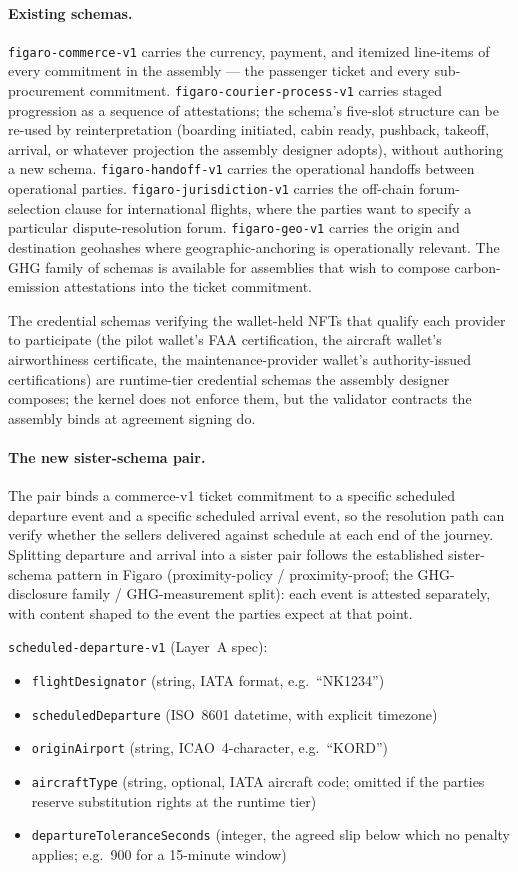 \documentclass[11pt,a4paper]{article}
\theoremstyle{definition}
\theoremstyle{remark}
\begin{document}
\paragraph{Existing schemas.}
\texttt{figaro-commerce-v1} carries the currency, payment, and
itemized line-items of every commitment in the assembly --- the
passenger ticket and every sub-procurement commitment.
\texttt{figaro-courier-process-v1} carries staged progression
as a sequence of attestations; the schema's five-slot structure
can be re-used by reinterpretation (boarding initiated, cabin
ready, pushback, takeoff, arrival, or whatever projection the
assembly designer adopts), without authoring a new schema.
\texttt{figaro-handoff-v1} carries the operational handoffs
between operational parties.
\texttt{figaro-jurisdiction-v1} carries the off-chain
forum-selection clause for international flights, where the
parties want to specify a particular dispute-resolution forum.
\texttt{figaro-geo-v1} carries the origin and destination
geohashes where geographic-anchoring is operationally relevant.
The GHG family of schemas is available for assemblies that wish
to compose carbon-emission attestations into the ticket
commitment.

The credential schemas verifying the wallet-held NFTs that
qualify each provider to participate (the pilot wallet's FAA
certification, the aircraft wallet's airworthiness certificate,
the maintenance-provider wallet's authority-issued certifications)
are runtime-tier credential schemas the assembly designer
composes; the kernel does not enforce them, but the validator
contracts the assembly binds at agreement signing do.

\paragraph{The new sister-schema pair.}
The pair binds a commerce-v1 ticket commitment to a specific
scheduled departure event and a specific scheduled arrival event,
so the resolution path can verify whether the sellers delivered
against schedule at each end of the journey. Splitting departure
and arrival into a sister pair follows the established
sister-schema pattern in Figaro (proximity-policy /
proximity-proof; the GHG-disclosure family / GHG-measurement
split): each event is attested separately, with content shaped
to the event the parties expect at that point.

\texttt{scheduled-departure-v1} (Layer~A spec):
\begin{itemize}
  \item \texttt{flightDesignator} (string, IATA format, e.g.\ ``NK1234'')
  \item \texttt{scheduledDeparture} (ISO~8601 datetime, with explicit timezone)
  \item \texttt{originAirport} (string, ICAO~4-character, e.g.\ ``KORD'')
  \item \texttt{aircraftType} (string, optional, IATA aircraft code; omitted
    if the parties reserve substitution rights at the runtime tier)
  \item \texttt{departureToleranceSeconds} (integer, the agreed slip below
    which no penalty applies; e.g.\ 900 for a 15-minute window)
\end{itemize}
\end{document}
